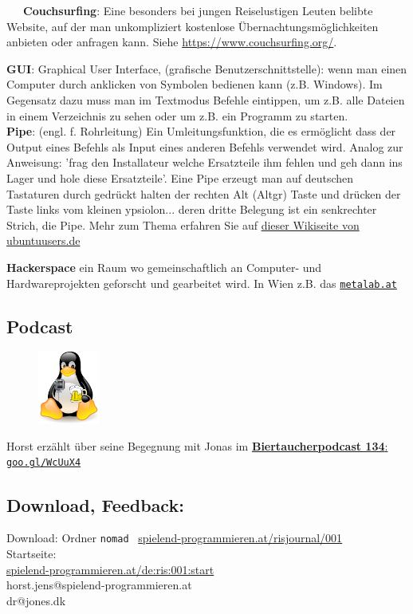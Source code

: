 ~~~\textbf{Couchsurfing}: Eine besonders bei jungen Reiselustigen Leuten belibte Website, auf der man unkompliziert kostenlose Übernachtungsmöglichkeiten anbieten oder anfragen kann. Siehe \url{https://www.couchsurfing.org/}.

\textbf{GUI}: Graphical User Interface, (grafische Benutzerschnittstelle): wenn man einen Computer durch anklicken von Symbolen bedienen kann (z.B. Windows). Im Gegensatz dazu muss man im Textmodus Befehle eintippen, um z.B. alle Dateien in einem Verzeichnis zu sehen oder um z.B. ein Programm zu starten. \\

\textbf{Pipe}: (engl. f. Rohrleitung) Ein Umleitungsfunktion, die es ermöglicht dass der Output eines Befehls als Input eines anderen Befehls verwendet wird. Analog zur Anweisung: 'frag den Installateur welche Ersatzteile ihm fehlen und geh dann ins Lager und hole diese Ersatzteile'. Eine Pipe erzeugt man auf deutschen Tastaturen durch gedrückt halten der rechten Alt (Altgr) Taste und drücken der Taste links vom kleinen ypsiolon... deren dritte Belegung ist ein senkrechter Strich, die Pipe. Mehr zum Thema erfahren Sie auf \href{http://wiki.ubuntuusers.de/Shell/Umleitungen}{dieser Wikiseite von ubuntuusers.de} 

\textbf{Hackerspace} ein Raum wo gemeinschaftlich an Computer- und Hardwareprojekten geforscht und gearbeitet wird. In Wien z.B. das \href{http://metalab.at}{\texttt{metalab.at}} 

\subsection*{Podcast}
\begin{figure}
\includegraphics[width=2cm]{nomad/biertaucherlogo.png}
\end{figure}
Horst erzählt über seine Begegnung mit Jonas im  \href{http://spielend-programmieren.at/de:podcast:biertaucher:2013:134}{\textbf{Biertaucherpodcast 134}: \texttt{goo.gl/WcUuX4}}


\subsection*{Download, Feedback:}
\footnotesize{
Download: Ordner \texttt{nomad} \Mundus\ \href{http://spielend-programmieren.at/risjournal/001}{spielend-programmieren.at/risjournal/001}\\
Startseite:\\
\href{http://spielend-programmieren.at/de:ris:001:start}{spielend-programmieren.at/de:ris:001:start}\\ 
\Letter\: horst.jens@spielend-programmieren.at\\
\Letter\: dr@jones.dk\\}
\normalsize 



